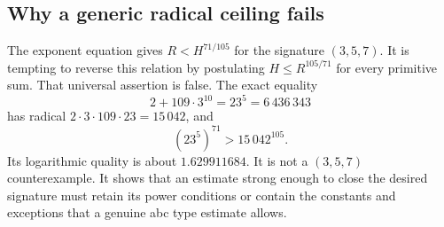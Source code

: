\subsection{Why a generic radical ceiling fails}
The exponent equation gives $R<H^{71/105}$ for the signature $(3,5,7)$. It is tempting to reverse this relation by postulating $H\le R^{105/71}$ for every primitive sum. That universal assertion is false. The exact equality
\[
2+109\cdot3^{10}=23^5=6\,436\,343
\]
has radical $2\cdot3\cdot109\cdot23=15\,042$, and
\[
(23^5)^{71}>15\,042^{105}.
\]
Its logarithmic quality is about $1.629911684$. It is not a $(3,5,7)$ counterexample. It shows that an estimate strong enough to close the desired signature must retain its power conditions or contain the constants and exceptions that a genuine abc type estimate allows.
